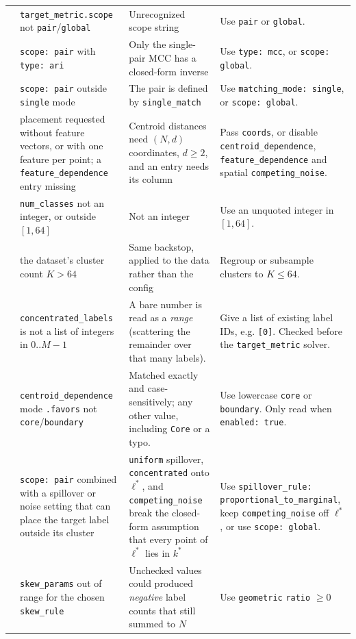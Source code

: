 \documentclass[a4paper,11pt]{article}
\newcommand{\vcode}[1]{\textcolor{valred}{\bfseries\ttfamily #1}}
\begin{document}
\begin{longtable}{@{}L{1.0cm} L{3.5cm} L{4.6cm} L{5.4cm}@{}}
\vcode{122} & \texttt{target\_metric.scope} not \texttt{pair}/\texttt{global} & Unrecognized scope string & Use \texttt{pair} or \texttt{global}. \\
\vcode{123} & \texttt{scope: pair} with \texttt{type: ari} & Only the single-pair MCC has a closed-form inverse & Use \texttt{type: mcc}, or \texttt{scope: global}. \\
\vcode{124}& \texttt{scope: pair} outside \texttt{single} mode & The pair is defined by \texttt{single\_match} & Use \texttt{matching\_mode: single}, or \texttt{scope: global}. \\
\vcode{125} & placement requested without feature vectors, or with one feature per point; a \texttt{feature\_dependence} entry missing & Centroid distances need $(N,d)$ coordinates, $d \ge 2$, and an entry needs its column & Pass \texttt{coords}, or disable \texttt{centroid\_dependence}, \texttt{feature\_dependence} and spatial \texttt{competing\_noise}. \\
\vcode{126} & \texttt{num\_classes} not an integer, or outside $[1,64]$ & Not an integer & Use an unquoted integer in $[1,64]$. \\
\vcode{127} & the dataset's cluster count $K > 64$ & Same backstop, applied to the data rather than the config & Regroup or subsample clusters to $K\leq64$. \\
\vcode{128} & \texttt{concentrated\_labels} is not a list of integers in $0..M{-}1$ & A bare number is read as a \emph{range} (scattering the remainder over that many labels). & Give a list of existing label IDs, e.g. \texttt{[0]}. Checked before the \texttt{target\_metric} solver. \\
\vcode{129} & \texttt{centroid\_dependence} mode \texttt{.favors} not \texttt{core}/\texttt{boundary} & Matched exactly and case-sensitively; any other value, including \texttt{Core} or a typo. & Use lowercase \texttt{core} or \texttt{boundary}. Only read when \texttt{enabled: true}. \\
\hline
\vcode{130} & \texttt{scope: pair} combined with a spillover or noise setting that can place the target label outside its cluster & \texttt{uniform} spillover, \texttt{concentrated} onto $\ell^*$, and \texttt{competing\_noise} break the closed-form assumption that every point of $\ell^*$ lies in $k^*$ & Use \texttt{spillover\_rule: proportional\_to\_marginal}, keep \texttt{competing\_noise} off $\ell^*$, or use \texttt{scope: global}. \\
\vcode{131} & \texttt{skew\_params} out of range for the chosen \texttt{skew\_rule} & Unchecked values could produced \emph{negative} label counts that still summed to $N$ & Use \texttt{geometric} \texttt{ratio} $\geq 0$\\

\end{longtable}
\end{document}
